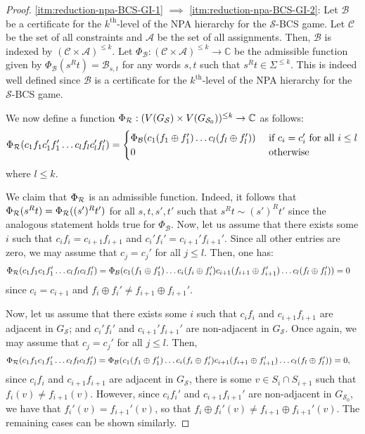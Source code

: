 \documentclass[11pt,a4paper]{article}
\theoremstyle{plain}
\theoremstyle{remark}
\theoremstyle{definition}
\def\calA{{\mathcal A}} \def\calB{{\mathcal B}} \def\calC{{\mathcal C}}
\def\calS{{\mathcal S}} \def\calT{{\mathcal T}} \def\calU{{\mathcal U}}
\begin{document}
\begin{proof}
    \ref{itm:reduction-npa-BCS-GI-1} $\implies$ \ref{itm:reduction-npa-BCS-GI-2}: Let $\calB$ be a certificate for the $k^{\text{th}}$-level of the NPA hierarchy for the $\calS$-BCS game. Let $\calC$ be the set of all constraints and $\calA$ be the set of all assignments. Then, $\calB$ is indexed by $(\calC \times \calA)^{\leq k}$. Let $\Phi_{\calB}: (\calC \times \calA)^{\leq k} \to \mathbb{C}$ be the admissible function given by $\Phi_{\calB}(s^Rt) = \calB_{s,t}$ for any words $s,t$ such that $s^Rt \in \Sigma^{\leq k}$. This is indeed well defined since $\calB$ is a certificate for the $k^{\text{th}}$-level of the NPA hierarchy for the $\calS$-BCS game.

    We now define a function $\Phi_\calR: (V(G_{\calS}) \times V(G_{\calS_0}))^{\leq k} \to \mathbb{C}$ as follows: 
    \begin{align}
    \begin{aligned}
        \Phi_{\calR}(c_1f_1c_1'f_1'\dots c_lf_lc_l'f_l') = \begin{cases} \Phi_{\calB}(c_1(f_1 \oplus f_1')\dots c_l(f_l \oplus f_l')) & \text{ if } c_i = c_i'\text{ for all } i \leq l \\
            0 & \text{ otherwise }
        \end{cases}
    \end{aligned}
    \end{align}
    where $l \leq k$.

    We claim that $\Phi_{{\mathcal R}}$ is an admissible function. Indeed, it follows that $\Phi_{\mathcal R}(s^Rt) = \Phi_{{\mathcal R}}((s')^Rt')$ for all $s,t,s',t'$ such that $s^Rt \sim (s')^Rt'$ since the analogous statement holds true for $\Phi_{\calB}$.  Now, let us assume that there exists some $i$ such that $c_if_i = c_{i+1}f_{i+1}$ and $c_i'f_i' = c_{i+1}'f_{i+1}'$. Since all other entries are zero, we may assume that $c_j = c_j'$ for all $j \leq l$. Then, one has:
    \begin{align*}
        \Phi_{\calR}(c_1f_1c_1f_1'\dots c_lf_lc_lf_l') &= \Phi_{\calB}(c_1(f_1 \oplus f_1')\dots c_i(f_i \oplus f_i') c_{i+1}(f_{i+1} \oplus f_{i+1}')\dots c_l(f_l \oplus f_l')) = 0
    \end{align*}
    since $c_i = c_{i+1}$ and $f_i \oplus f_i' \neq f_{i+1} \oplus f_{i+1}'$.
    
    Now, let us assume that there exists some $i$ such that $c_if_i$ and $c_{i+1}f_{i+1}$ are adjacent in $G_{\calS}$; and $c_i'f_i'$ and $c_{i+1}'f_{i+1}'$ are non-adjacent in $G_{\calS}$. Once again, we may assume that $c_j = c_j'$ for all $j \leq l$. Then,   
    \begin{align*}
        \Phi_{\calR}(c_1f_1c_1f_1'\dots c_lf_lc_lf_l') &= \Phi_{\calB}(c_1(f_1 \oplus f_1')\dots c_i(f_i \oplus f_i') c_{i+1}(f_{i+1} \oplus f_{i+1}')\dots c_l(f_l \oplus f_l')) = 0,
    \end{align*}
    since $c_if_i$ and $c_{i+1}f_{i+1}$ are adjacent in $G_\calS$, there is some $v \in S_i \cap S_{i+1}$ such that $f_i(v) \neq f_{i+1}(v)$. However, since $c_if_i'$ and $c_{i+1}f_{i+1}'$ are non-adjacent in $G_{\calS_0}$, we have that $f_i'(v) = f_{i+1}'(v)$, so that $f_i\oplus f_i'(v) \neq f_{i+1}\oplus f_{i+1}'(v)$. The remaining cases can be shown similarly. 


\end{proof}
\end{document}
